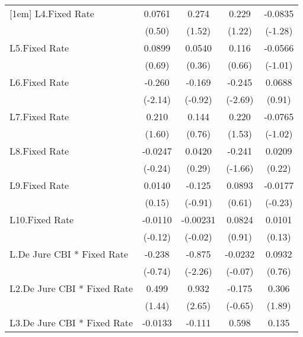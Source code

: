 {\begin{longtable}{l*{4}{c}}
[1em]
L4.Fixed Rate   &   0.0761         &    0.274         &    0.229         &  -0.0835         \\
                &   (0.50)         &   (1.52)         &   (1.22)         &  (-1.28)         \\
[1em]
L5.Fixed Rate   &   0.0899         &   0.0540         &    0.116         &  -0.0566         \\
                &   (0.69)         &   (0.36)         &   (0.66)         &  (-1.01)         \\
[1em]
L6.Fixed Rate   &   -0.260\sym{*}  &   -0.169         &   -0.245\sym{**} &   0.0688         \\
                &  (-2.14)         &  (-0.92)         &  (-2.69)         &   (0.91)         \\
[1em]
L7.Fixed Rate   &    0.210         &    0.144         &    0.220         &  -0.0765         \\
                &   (1.60)         &   (0.76)         &   (1.53)         &  (-1.02)         \\
[1em]
L8.Fixed Rate   &  -0.0247         &   0.0420         &   -0.241         &   0.0209         \\
                &  (-0.24)         &   (0.29)         &  (-1.66)         &   (0.22)         \\
[1em]
L9.Fixed Rate   &   0.0140         &   -0.125         &   0.0893         &  -0.0177         \\
                &   (0.15)         &  (-0.91)         &   (0.61)         &  (-0.23)         \\
[1em]
L10.Fixed Rate  &  -0.0110         & -0.00231         &   0.0824         &   0.0101         \\
                &  (-0.12)         &  (-0.02)         &   (0.91)         &   (0.13)         \\
[1em]
L.De Jure CBI * Fixed Rate&   -0.238         &   -0.875\sym{*}  &  -0.0232         &   0.0932         \\
                &  (-0.74)         &  (-2.26)         &  (-0.07)         &   (0.76)         \\
[1em]
L2.De Jure CBI * Fixed Rate&    0.499         &    0.932\sym{**} &   -0.175         &    0.306         \\
                &   (1.44)         &   (2.65)         &  (-0.65)         &   (1.89)         \\
[1em]
L3.De Jure CBI * Fixed Rate&  -0.0133         &   -0.111         &    0.598\sym{*}  &    0.135         \\

\end{longtable}}
